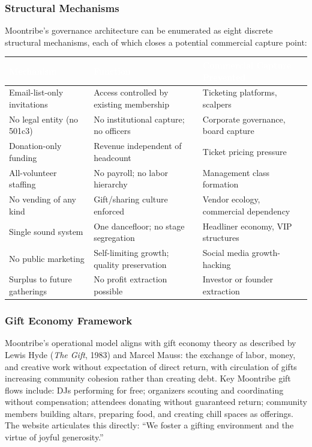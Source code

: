 \documentclass[11pt,letterpaper]{article}
\newcommand{\tableheader}[1]{\textbf{\sffamily\textcolor{white}{#1}}}
\begin{document}
\subsubsection{Structural Mechanisms}

Moontribe's governance architecture can be enumerated as eight discrete structural mechanisms, each of which closes a potential commercial capture point:

\begin{center}
\begin{tabularx}{\textwidth}{L{4cm}XL{3cm}}
\toprule
{}
\tableheader{Mechanism} & \tableheader{Function} & \tableheader{Commercial Capture Prevented} \\
\midrule
Email-list-only invitations & Access controlled by existing membership & Ticketing platforms, scalpers \\
No legal entity (no 501c3) & No institutional capture; no officers & Corporate governance, board capture \\
Donation-only funding & Revenue independent of headcount & Ticket pricing pressure \\
All-volunteer staffing & No payroll; no labor hierarchy & Management class formation \\
No vending of any kind & Gift/sharing culture enforced & Vendor ecology, commercial dependency \\
Single sound system & One dancefloor; no stage segregation & Headliner economy, VIP structures \\
No public marketing & Self-limiting growth; quality preservation & Social media growth-hacking \\
Surplus to future gatherings & No profit extraction possible & Investor or founder extraction \\
\bottomrule
\end{tabularx}
\end{center}

\subsubsection{Gift Economy Framework}

Moontribe's operational model aligns with gift economy theory as described by Lewis Hyde (\textit{The Gift}, 1983) and Marcel Mauss: the exchange of labor, money, and creative work without expectation of direct return, with circulation of gifts increasing community cohesion rather than creating debt. Key Moontribe gift flows include: DJs performing for free; organizers scouting and coordinating without compensation; attendees donating without guaranteed return; community members building altars, preparing food, and creating chill spaces as offerings. The website articulates this directly: ``We foster a gifting environment and the virtue of joyful generosity.''
\end{document}
